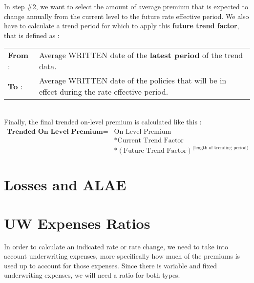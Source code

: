 \documentclass[11pt, english]{memoir}
\numberwithin{definition}{section}
\begin{document}
	\begin{tcolorbox}[adjusted title = \textbf{Step \#2}]
		In step \#2, we want to select the amount of average premium that is expected to change annually from the current level to the future rate effective period. We also have to calculate a trend period for which to apply this \textbf{future trend factor}, that is defined as : \\
		
		\begin{tabular}{ll}
		 	\textbf{From} : & 	\begin{minipage}{0.8\linewidth}
							 		Average WRITTEN date of the \textbf{latest period} of the trend data.
							 	\end{minipage}\\[10pt]
		 	\textbf{To} : & \begin{minipage}{0.8\linewidth}
						 		Average WRITTEN date of the policies that will be in effect during the rate effective period.
						 	\end{minipage}\\ 
		\end{tabular}\\[10pt]
	
		Finally, the final trended on-level premium is calculated like this :
		\begin{align*}
		\textbf{Trended On-Level Premium} = \  &\text{On-Level Premium}\\
		&*\text{Current Trend Factor}\\
		&*(\text{Future Trend Factor})^{\text{(length of trending period)}}
		\end{align*}
	\end{tcolorbox}
	
	
	
	
	
	
	
	
	
\chapter{Losses and ALAE}





	
	
\chapter{UW Expenses Ratios}	

In order to calculate an indicated rate or rate change, we need to take into account underwriting expenses, more specifically how much of the premiums is used up to account for those expenses. Since there is variable and fixed underwriting expenses, we will need a ratio for both types.
\end{document}

